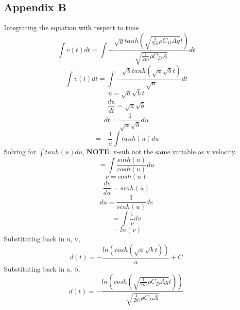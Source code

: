 \documentclass[12pt]{report}
\begin{document}
\subsection*{Appendix B}
\noindent Integrating the equation with respect to time
\begin{equation*}
	\int v(t)dt = \int -\frac{\sqrt{g} tanh(\sqrt{\frac{1}{2m}\rho C_D A g}t)}{\sqrt{\frac{1}{2m}\rho C_D A}}dt
\end{equation*}
\begin{equation*}
	\int v(t)dt = \int -\frac{\sqrt{b}tanh(\sqrt{a}\sqrt{b}t)}{\sqrt{a}}dt
\end{equation*}
\begin{equation*}
	u = \sqrt{a}\sqrt{b}t
\end{equation*}
\begin{equation*}
	\frac{du}{dt} = \sqrt{a}\sqrt{b}
\end{equation*}
\begin{equation*}
	dt = \frac{1}{\sqrt{a}\sqrt{b}}du
\end{equation*}
\begin{equation*}
	= -\frac{1}{a}\int tanh(u)du
\end{equation*}
\noindent Solving for $\int tanh(u)du$, \textbf{NOTE}: v-sub not the same variable as v velocity.
\begin{equation*}
	=\int \frac{sinh(u)}{cosh(u)}du
\end{equation*}
\begin{equation*}
	v= cosh(u)
\end{equation*}
\begin{equation*}
	\frac{dv}{du}=sinh(u)
\end{equation*}
\begin{equation*}
	du = \frac{1}{sinh(u)}dv
\end{equation*}
\begin{equation*}
	=\int \frac{1}{v}dv
\end{equation*}
\begin{equation*}
	=ln(v)
\end{equation*}
\noindent Substituting back in u, v,
\begin{equation*}
	d(t) = -\frac{ln(cosh(\sqrt{a}\sqrt{b}t))}{a}+C
\end{equation*}
\noindent Substituting back in a, b,
\begin{equation*}
	d(t) = -\frac{ln(cosh(\sqrt{\frac{1}{2m}\rho C_D A g}t))}{\sqrt{\frac{1}{2m}\rho C_D A}}
\end{equation*}
\end{document}
